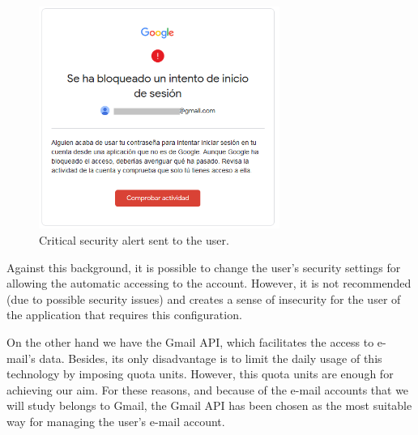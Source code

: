 \begin{figure}
	\centering%
	\includegraphics[width = 0.7\textwidth]{Imagenes/Bitmap/securityAlert.png}%
	\caption{Critical security alert sent to the user.}%
	\label{fig:secalert}
\end{figure}

Against this background, it is possible to change the user's security settings for allowing the automatic accessing to the account. However, it is not recommended (due to possible security issues) and creates a sense of insecurity for the user of the application that requires this configuration.

On the other hand we have the Gmail API, which facilitates the access to e-mail's data. Besides, its only disadvantage is to limit the daily usage of this technology by imposing quota units. However, this quota units are enough for achieving our aim. For these reasons, and because of the e-mail accounts that we will study belongs to Gmail, the Gmail API has been chosen as the most suitable way for managing the user's e-mail account.